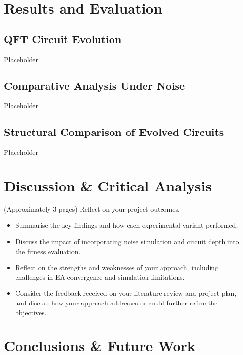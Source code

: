 \documentclass[11pt,a4paper]{article}
\begin{document}
\section{Results and Evaluation}
\subsection{QFT Circuit Evolution}
Placeholder

\subsection{Comparative Analysis Under Noise}
Placeholder

\subsection{Structural Comparison of Evolved Circuits}
Placeholder

%
%
\section{Discussion \& Critical Analysis}
(Approximately 3 pages) Reflect on your project outcomes.

\begin{itemize}
  \item Summarise the key findings and how each experimental variant performed.
  \item Discuss the impact of incorporating noise simulation and circuit depth into the fitness evaluation.
  \item Reflect on the strengths and weaknesses of your approach, including challenges in EA convergence and simulation limitations.
  \item Consider the feedback received on your literature review and project plan, and discuss how your approach addresses or could further refine the objectives.
\end{itemize}

%
%
\section{Conclusions \& Future Work}
\end{document}
